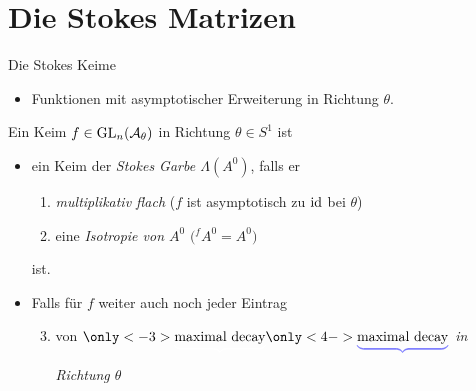 \section{Die Stokes Matrizen}
\begin{frame}{Die Stokes Keime}
  \begin{defn}
    \vspace{-3em}
    \begin{flushright}
      \begin{minipage}{.55\textwidth}
        \begin{itemize}
        \item[\tikzmarkc{n1}{blue}] Funktionen mit asymptotischer Erweiterung
          in Richtung $\theta$.
        \end{itemize}
      \end{minipage}
    \end{flushright}
    \begin{flushright}
    \end{flushright}
    \vspace{-2em}
    Ein Keim $f\in\Gl_n(\overset{\tikzmark{e1}}{\cA_\theta})$ in Richtung
    $\theta\in S^1$ ist
    \begin{itemize}
    \item ein Keim der \emph{Stokes Garbe \boldmath$\Lambda(A^0)$}, falls er
      \begin{enumerate}
      \item\emph{multiplikativ flach} ($f$ ist asymptotisch zu $\operatorname{id}$ bei
        $\theta$) 
      \item<2-> eine \emph{Isotropie von \boldmath$A^0$} $\bigl({}^fA^0=A^0\bigr)$
      \end{enumerate}
      ist.
    \item<3-> Falls für $f$ weiter auch noch jeder Eintrag
      \begin{enumerate}
        \setcounter{enumi}{2}
      \item von
        \emph{$\underset{\tikzmarkt{e2}}{%
              \only<-3>{%
                \textcolor{white}{\underbrace{\text{%
                      \textcolor{black}{maximal decay}}}}
              }
              \only<4->{%
                \textcolor{blue!50!white}{\underbrace{\text{%
                      \textcolor{black}{maximal decay}}}}
              }
            }$
          in Richtung \boldmath$\theta$}
\end{enumerate}
\end{itemize}
\end{defn}
\end{frame}
